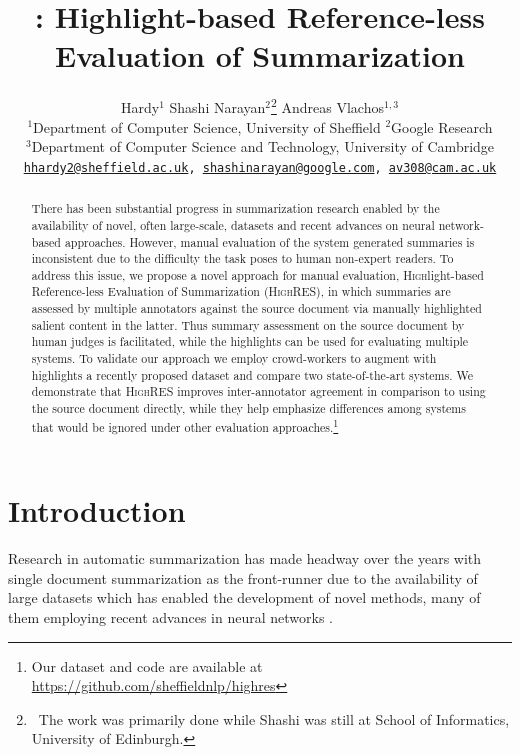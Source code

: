\documentclass[11pt,a4paper]{article}
\title{\highres: Highlight-based Reference-less Evaluation of Summarization}
\author{Hardy$^1$ \quad Shashi Narayan$^2$\thanks{\ The work was primarily done while Shashi was still at School of Informatics, University of Edinburgh.} \quad Andreas Vlachos$^{1,3}$ \\
  $^{1}$Department of Computer Science, University of Sheffield \quad $^{2}$Google Research\\
  $^{3}$Department of Computer Science and Technology, University of Cambridge \\
  \tt{\small \url{hhardy2@sheffield.ac.uk}}, \tt{\small \url{shashinarayan@google.com}}, \tt{\small \url{av308@cam.ac.uk}} \\}
\date{}
\newcommand\highres{\textsc{HighRES}}
\begin{document}
\maketitle
\begin{abstract}
  There has been substantial progress in summarization research enabled by the availability of novel, often large-scale, datasets and recent advances on neural network-based approaches. 
  However, manual evaluation of the system generated summaries is inconsistent due to the difficulty the task poses to human non-expert readers.
  To address this issue, we propose a novel approach for manual evaluation,  \textsc{High}light-based \textsc{R}eference-less \textsc{E}valuation of \textsc{S}ummarization (\highres), in which summaries are assessed by multiple annotators against the source document via manually highlighted salient content in the latter. Thus summary assessment on the source document by human judges is facilitated,  while the highlights can be used for evaluating multiple systems.
   To validate our approach we employ crowd-workers to augment with highlights a recently proposed dataset and compare two state-of-the-art systems. We demonstrate that \highres{} improves inter-annotator agreement in comparison to using the source document directly, while they help emphasize differences among systems that would be ignored under other evaluation approaches.\footnote{Our dataset and code are available at \url{https://github.com/sheffieldnlp/highres}}
\end{abstract}

\section{Introduction}

Research in automatic summarization has made headway over the years with single document summarization as the front-runner due to the availability of large datasets \citep{Sandhaus2008,Hermann2015,narayan18xsum} which has enabled the development of novel methods, many of them employing recent advances in neural networks 
\citep[\textit{inter alia}]{See2017,Narayan2018,Pasunuru2018a}. 
\end{document}
